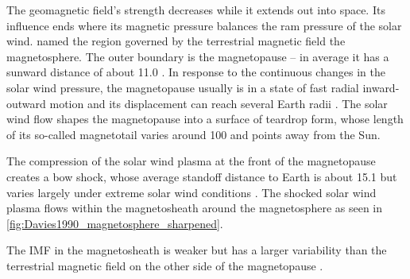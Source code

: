 The geomagnetic field's strength decreases while it extends out into space. Its influence ends where its magnetic pressure balances the ram pressure of the solar wind. \citet{Gold1959} named the region governed by the terrestrial magnetic field the magnetosphere. The outer boundary is the magnetopause -- in average it has a sunward distance of about \SI{11.0}{\RE} \citep{Fairfield1971}. In response to the continuous changes in the solar wind pressure, the magnetopause usually is in a state of fast radial inward-outward motion and its displacement can reach several Earth radii \citep{DeKeyser2005}. The solar wind flow shapes the magnetopause into a surface of teardrop form, whose length of its so-called magnetotail varies around \SI{100}{\RE} and points away from the Sun.

The compression of the solar wind plasma at the front of the magnetopause creates a bow shock, whose average standoff distance to Earth is about \SI{15.1}{\RE} but varies largely under extreme solar wind conditions \citep{Fairfield1971}. The shocked solar wind plasma flows within the magnetosheath around the magnetosphere as seen in \autoref{fig:Davies1990_magnetosphere_sharpened}.
\begin{figure}[htb]
\end{figure}
The IMF in the magnetosheath is weaker but has a larger variability than the terrestrial magnetic field on the other side of the magnetopause \citep{DeKeyser2005}.

